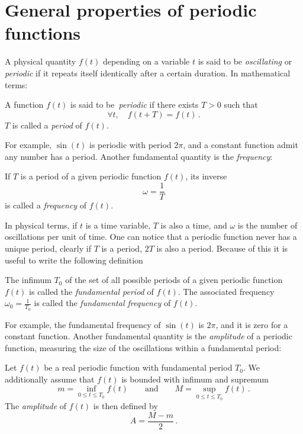 \section{General properties of periodic functions}
A physical quantity $f(t)$ depending on a variable $t$ is said to be \emph{oscillating} or
\emph{periodic} if it repeats itself identically after a certain duration. In mathematical
terms:
\begin{definition}
  A function $f(t)$ is said to be~\emph{periodic} if there exists $T>0$ such that
  \begin{equation}
    \forall t,\quad f(t+T)=f(t)\,.
  \end{equation}
  $T$ is called a \emph{period} of $f(t)$.
\end{definition}
\noindent For example, $\sin(t)$ is periodic with period $2\pi$, and a constant function
admit any number has a period. Another fundamental quantity is the \emph{frequency}:
\begin{definition}
  If $T$ is a period of a given periodic function $f(t)$, its inverse
  \begin{equation}
    \omega=\frac{1}{T}
  \end{equation}
  is called a \emph{frequency} of $f(t)$.
\end{definition}
\noindent In physical terms, if $t$ is a time variable, $T$ is also a time, and $\omega$
is the number of oscillations per unit of time. One can notice that a periodic function
never has a unique period, \eg clearly if $T$ is a period, $2T$ is also a period. Because
of this it is useful to write the following definition
\begin{definition}
  The infimum $T_0$ of the set of all possible periods of a given periodic function $f(t)$
  is called the \emph{fundamental period} of $f(t)$. The associated frequency
  $\omega_0=\frac{1}{T_0}$ is called the \emph{fundamental frequency} of $f(t)$.
\end{definition}
\noindent For example, the fundamental frequency of $\sin(t)$ is $2\pi$, and it is zero
for a constant function. Another fundamental quantity is the \emph{amplitude} of a
periodic function, measuring the size of the oscillations within a fundamental period:
\begin{definition}
  \label{def:amplitude}
  Let $f(t)$ be a real periodic function with fundamental period $T_0$. We additionally assume
  that $f(t)$ is bounded with infimum and supremum
  \begin{equation}
    m=\inf_{0\leq t\leq T_0}f(t)\qquad\text{and}\qquad M=\sup_{0\leq t\leq T_0}f(t)\,.
  \end{equation}
  The \emph{amplitude} of $f(t)$ is then defined by
  \begin{equation}
    A=\frac{M-m}{2}\,.
  \end{equation}
\end{definition}
